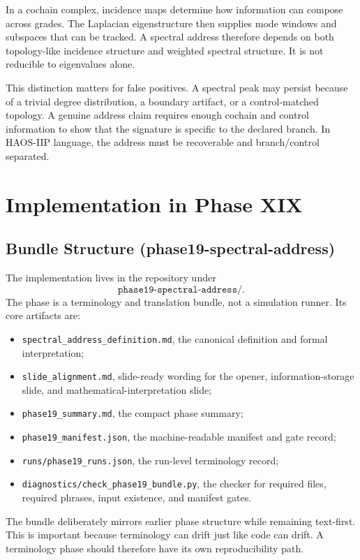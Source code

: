 \documentclass[11pt]{article}
\begin{document}
In a cochain complex, incidence maps determine how information can compose across grades. The Laplacian eigenstructure then supplies mode windows and subspaces that can be tracked. A spectral address therefore depends on both topology-like incidence structure and weighted spectral structure. It is not reducible to eigenvalues alone.

This distinction matters for false positives. A spectral peak may persist because of a trivial degree distribution, a boundary artifact, or a control-matched topology. A genuine address claim requires enough cochain and control information to show that the signature is specific to the declared branch. In HAOS-IIP language, the address must be recoverable and branch/control separated.

\section{Implementation in Phase XIX}

\subsection{Bundle Structure (phase19-spectral-address)}

The implementation lives in the repository under
\[
\texttt{phase19-spectral-address/}.
\]
The phase is a terminology and translation bundle, not a simulation runner. Its core artifacts are:

\begin{itemize}[leftmargin=1.5em]
\item \texttt{spectral\_address\_definition.md}, the canonical definition and formal interpretation;
\item \texttt{slide\_alignment.md}, slide-ready wording for the opener, information-storage slide, and mathematical-interpretation slide;
\item \texttt{phase19\_summary.md}, the compact phase summary;
\item \texttt{phase19\_manifest.json}, the machine-readable manifest and gate record;
\item \texttt{runs/phase19\_runs.json}, the run-level terminology record;
\item \texttt{diagnostics/check\_phase19\_bundle.py}, the checker for required files, required phrases, input existence, and manifest gates.
\end{itemize}

The bundle deliberately mirrors earlier phase structure while remaining text-first. This is important because terminology can drift just like code can drift. A terminology phase should therefore have its own reproducibility path.
\end{document}
